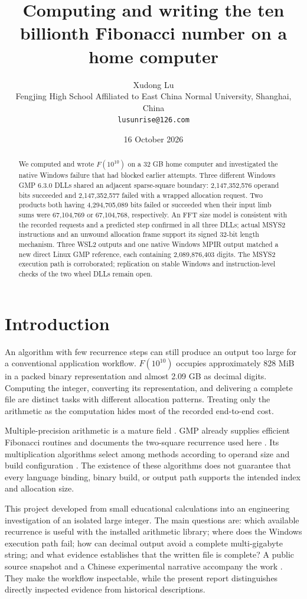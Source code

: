 \documentclass[11pt,a4paper]{article}
\title{Computing and writing the ten billionth Fibonacci number on a home computer}
\author{Xudong Lu\\Fengjing High School Affiliated to East China Normal University, Shanghai, China\\\texttt{lusunrise@126.com}}
\date{16 October 2026}
\begin{document}
\maketitle
\begin{abstract}
We computed and wrote $F(10^{10})$ on a 32 GB home computer and investigated the native Windows failure that had blocked earlier attempts. Three different Windows GMP 6.3.0 DLLs shared an adjacent sparse-square boundary: 2,147,352,576 operand bits succeeded and 2,147,352,577 failed with a wrapped allocation request. Two products both having 4,294,705,089 bits failed or succeeded when their input limb sums were 67,104,769 or 67,104,768, respectively. An FFT size model is consistent with the recorded requests and a predicted step confirmed in all three DLLs; actual MSYS2 instructions and an unwound allocation frame support its signed 32-bit length mechanism. Three WSL2 outputs and one native Windows MPIR output matched a new direct Linux GMP reference, each containing 2,089,876,403 digits. The MSYS2 execution path is corroborated; replication on stable Windows and instruction-level checks of the two wheel DLLs remain open.
\end{abstract}

\section{Introduction}

An algorithm with few recurrence steps can still produce an output too large for a conventional application workflow. $F(10^{10})$ occupies approximately 828 MiB in a packed binary representation and almost 2.09 GB as decimal digits. Computing the integer, converting its representation, and delivering a complete file are distinct tasks with different allocation patterns. Treating only the arithmetic as the computation hides most of the recorded end-to-end cost.

Multiple-precision arithmetic is a mature field \cite{brent}. GMP already supplies efficient Fibonacci routines and documents the two-square recurrence used here \cite{gmp_fib}. Its multiplication algorithms select among methods according to operand size and build configuration \cite{gmp_fft}. The existence of these algorithms does not guarantee that every language binding, binary build, or output path supports the intended index and allocation size.

This project developed from small educational calculations into an engineering investigation of an isolated large integer. The main questions are: which available recurrence is useful with the installed arithmetic library; where does the Windows execution path fail; how can decimal output avoid a complete multi-gigabyte string; and what evidence establishes that the written file is complete? A public source snapshot and a Chinese experimental narrative accompany the work \cite{software}. They make the workflow inspectable, while the present report distinguishes directly inspected evidence from historical descriptions.
\end{document}
